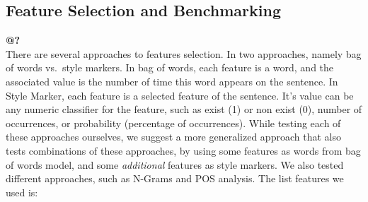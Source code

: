 \documentclass[a4paper]{article}
\begin{document}
\subsection{Feature Selection and Benchmarking}
\textbf{@?}\\
There are several approaches to features selection. In \cite{rachel} two approaches, namely bag of words vs.\ style markers.
In bag of words, each feature is a word, and the associated value is the number of time this word appears on the sentence.
In Style Marker, each feature is a selected feature of the sentence. It's value can be any numeric classifier for the feature, such as exist (1) or non exist (0), number of occurrences, or probability (percentage of occurrences).
While testing each of these approaches ourselves, we suggest a more generalized approach that also tests combinations of these approaches, by using some features as words from bag of words model, and some \emph{additional} features as style markers.
We also tested different approaches, such as N-Grams and POS analysis. The list features we used is:
\end{document}
